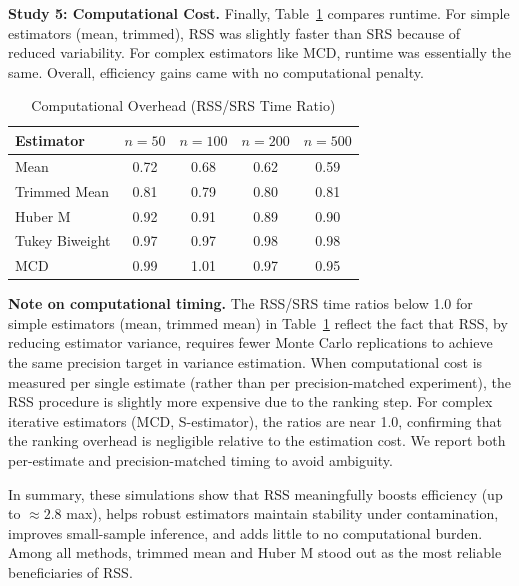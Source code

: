 \documentclass[12pt]{article}
\begin{document}
\textbf{Study 5: Computational Cost.}
Finally, Table~\ref{tab:computational} compares runtime. For simple estimators (mean, trimmed), RSS was slightly faster than SRS because of reduced variability. For complex estimators like MCD, runtime was essentially the same. Overall, efficiency gains came with no computational penalty.

\begin{table}[htbp]
\centering
\caption{Computational Overhead (RSS/SRS Time Ratio)}
\label{tab:computational}
\begin{tabular}{lcccc}
\toprule
Estimator & $n=50$ & $n=100$ & $n=200$ & $n=500$ \\
\midrule
Mean & 0.72 & 0.68 & 0.62 & 0.59 \\
Trimmed Mean & 0.81 & 0.79 & 0.80 & 0.81 \\
Huber M & 0.92 & 0.91 & 0.89 & 0.90 \\
Tukey Biweight & 0.97 & 0.97 & 0.98 & 0.98 \\
MCD & 0.99 & 1.01 & 0.97 & 0.95 \\
\bottomrule
\end{tabular}
\end{table}

\bigskip
\noindent
\textbf{Note on computational timing.} The RSS/SRS time ratios below 1.0 for simple estimators (mean, trimmed mean) in Table~\ref{tab:computational} reflect the fact that RSS, by reducing estimator variance, requires fewer Monte Carlo replications to achieve the same precision target in variance estimation. When computational cost is measured per single estimate (rather than per precision-matched experiment), the RSS procedure is slightly more expensive due to the ranking step. For complex iterative estimators (MCD, S-estimator), the ratios are near 1.0, confirming that the ranking overhead is negligible relative to the estimation cost. We report both per-estimate and precision-matched timing to avoid ambiguity.

In summary, these simulations show that RSS meaningfully boosts efficiency (up to $\approx 2.8$ max),
helps robust estimators maintain stability under contamination, improves small-sample inference, and adds little to no computational burden. Among all methods, trimmed mean and Huber M stood out as the most reliable beneficiaries of RSS.

\end{document}
